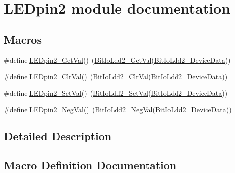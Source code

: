 \hypertarget{group___l_e_dpin2__module}{}\section{L\+E\+Dpin2 module documentation}
\label{group___l_e_dpin2__module}
\subsection*{Macros}
\begin{DoxyCompactItemize}
\item 
\#define \hyperlink{group___l_e_dpin2__module_ga061f97147af260178617a3fc72624300}{L\+E\+Dpin2\+\_\+\+Get\+Val}()~(\hyperlink{group___bit_io_ldd2__module_gab03a5a6cf33499000ac033b999a4f587}{Bit\+Io\+Ldd2\+\_\+\+Get\+Val}(\hyperlink{group___bit_io_ldd2__module_gaf2ef02c6b9a8451493963d7ae23c7574}{Bit\+Io\+Ldd2\+\_\+\+Device\+Data}))
\item 
\#define \hyperlink{group___l_e_dpin2__module_gaa47cab827e06b75f94eb46069f91515d}{L\+E\+Dpin2\+\_\+\+Clr\+Val}()~(\hyperlink{group___bit_io_ldd2__module_ga544e4e9c98ec5fa4934bcac68c17d303}{Bit\+Io\+Ldd2\+\_\+\+Clr\+Val}(\hyperlink{group___bit_io_ldd2__module_gaf2ef02c6b9a8451493963d7ae23c7574}{Bit\+Io\+Ldd2\+\_\+\+Device\+Data}))
\item 
\#define \hyperlink{group___l_e_dpin2__module_ga9937d1afa03ed5b4b392fc8ff4b0276a}{L\+E\+Dpin2\+\_\+\+Set\+Val}()~(\hyperlink{group___bit_io_ldd2__module_gaa2b2b2e4849f05c5454ca6eb6d88fe6d}{Bit\+Io\+Ldd2\+\_\+\+Set\+Val}(\hyperlink{group___bit_io_ldd2__module_gaf2ef02c6b9a8451493963d7ae23c7574}{Bit\+Io\+Ldd2\+\_\+\+Device\+Data}))
\item 
\#define \hyperlink{group___l_e_dpin2__module_ga785294b54fde11d21a6c5ed73ddbabdd}{L\+E\+Dpin2\+\_\+\+Neg\+Val}()~(\hyperlink{group___bit_io_ldd2__module_ga90ce20ceb13c4409d5526b15f0054e1a}{Bit\+Io\+Ldd2\+\_\+\+Neg\+Val}(\hyperlink{group___bit_io_ldd2__module_gaf2ef02c6b9a8451493963d7ae23c7574}{Bit\+Io\+Ldd2\+\_\+\+Device\+Data}))
\end{DoxyCompactItemize}


\subsection{Detailed Description}


\subsection{Macro Definition Documentation}
\mbox{\label{group___l_e_dpin2__module_gaa47cab827e06b75f94eb46069f91515d}} 
